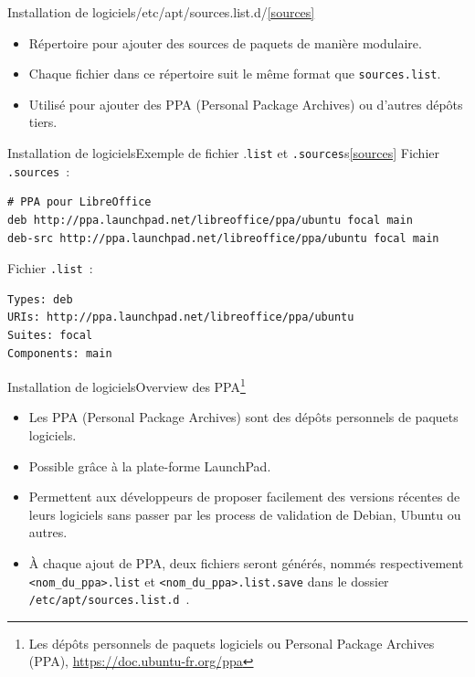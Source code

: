 \documentclass{beamer}
\begin{document}
    \begin{frame}{Installation de logiciels}{/etc/apt/sources.list.d/\cref{sources}}
        \begin{itemize}
            \item Répertoire pour ajouter des sources de paquets de manière modulaire.
            \item Chaque fichier dans ce répertoire suit le même format que \lstinline{sources.list}.
            \item Utilisé pour ajouter des PPA (Personal Package Archives) ou d'autres dépôts tiers.
        \end{itemize}
    \end{frame}

    \begin{frame}[fragile]{Installation de logiciels}{Exemple de fichier .\lstinline{list} et \lstinline{.sources}s\cref{sources}}
        \bigbreak
        Fichier \lstinline{.sources}~:
        \begin{lstlisting}
# PPA pour LibreOffice
deb http://ppa.launchpad.net/libreoffice/ppa/ubuntu focal main
deb-src http://ppa.launchpad.net/libreoffice/ppa/ubuntu focal main
        \end{lstlisting}
        \bigbreak
        Fichier \lstinline{.list}~:
        \begin{lstlisting}
Types: deb
URIs: http://ppa.launchpad.net/libreoffice/ppa/ubuntu
Suites: focal
Components: main
        \end{lstlisting}
    \end{frame}

    \begin{frame}{Installation de logiciels}{Overview des PPA\footnote{\label{ppa}Les dépôts personnels de paquets logiciels ou Personal Package Archives (PPA), \url{https://doc.ubuntu-fr.org/ppa}}}
        \begin{itemize}
            \item Les PPA (Personal Package Archives) sont des dépôts personnels de paquets logiciels.
            \item Possible grâce à la plate-forme LaunchPad.
            \item Permettent aux développeurs de proposer facilement des versions récentes de leurs logiciels sans passer par les process de validation de Debian, Ubuntu ou autres.
            \item À chaque ajout de PPA, deux fichiers seront générés, nommés respectivement \lstinline{<nom_du_ppa>.list} et \lstinline{<nom_du_ppa>.list.save} dans le dossier \lstinline{/etc/apt/sources.list.d}~.
        \end{itemize}
    \end{frame}
\end{document}
